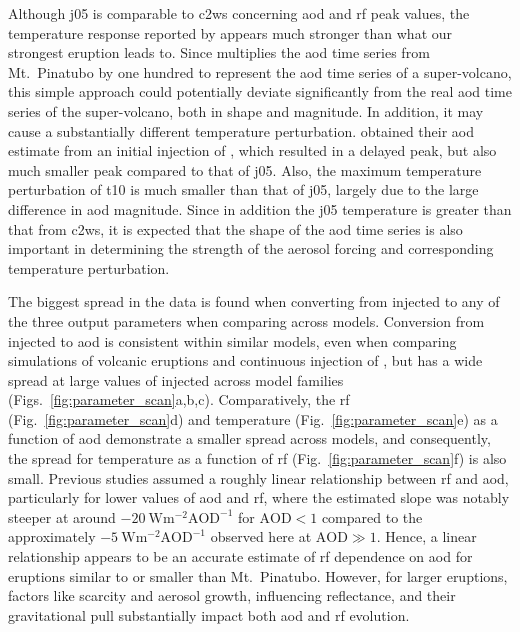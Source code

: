\documentclass{ametsocV6.1}
\newcommand{\iso}[1][i]{{#1}njected \ce{SO2}}
\begin{document}
Although \gls{j05} is comparable to \gls{c2ws} concerning \gls{aod} and \gls{rf} peak
values, the temperature response reported by \citet{jones2005} appears much stronger
than what our strongest eruption leads to. Since \citet{jones2005} multiplies the
\gls{aod} time series from Mt.\ Pinatubo by one hundred to represent the \gls{aod} time
series of a super-volcano, this simple approach could potentially deviate significantly
from the real \gls{aod} time series of the super-volcano, both in shape and magnitude.
In addition, it may cause a substantially different temperature perturbation.
\citet{timmreck2010} obtained their \gls{aod} estimate from an initial injection of
, which resulted in a delayed peak, but also much smaller peak compared to that
of \gls{j05}. Also, the maximum temperature perturbation of \gls{t10} is much smaller
than that of \gls{j05}, largely due to the large difference in \gls{aod} magnitude.
Since in addition the \gls{j05} temperature is greater than that from \gls{c2ws}, it is
expected that the shape of the \gls{aod} time series is also important in determining
the strength of the aerosol forcing and corresponding temperature perturbation.

The biggest spread in the data is found when converting from \iso{} to any of the three
output parameters when comparing across models. Conversion from \iso{} to \gls{aod} is
consistent within similar models, even when comparing simulations of volcanic eruptions
\citep{timmreck2010} and continuous injection of  \citep{niemeier2015}, but has
a wide spread at large values of \iso{} across model families
(Figs.~\ref{fig:parameter_scan}a,b,c). Comparatively, the \gls{rf}
(Fig.~\ref{fig:parameter_scan}d) and temperature (Fig.~\ref{fig:parameter_scan}e) as a
function of \gls{aod} demonstrate a smaller spread across models, and consequently, the
spread for temperature as a function of \gls{rf} (Fig.~\ref{fig:parameter_scan}f) is
also small. Previous studies assumed a roughly linear relationship between \gls{rf} and
\gls{aod}, particularly for lower values of \gls{aod} and \gls{rf}, where the estimated
slope was notably steeper at around \(\SI{-20}{\watt\metre^{-2}\mathrm{AOD}^{-1}}\) for
\(\mathrm{AOD}<1\) compared to the approximately
\(\SI{-5}{\watt\metre^{-2}\mathrm{AOD}^{-1}}\) observed here at \(\mathrm{AOD}\gg1\).
Hence, a linear relationship appears to be an accurate estimate of \gls{rf} dependence
on \gls{aod} for eruptions similar to or smaller than Mt.\ Pinatubo. However, for larger
eruptions, factors like  scarcity and aerosol growth, influencing reflectance,
and their gravitational pull substantially impact both \gls{aod} and \gls{rf} evolution.
\end{document}
